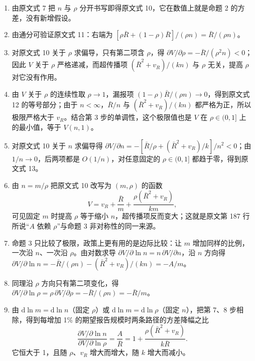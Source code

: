 \begin{enumerate}
\item 由原文式 7 把 $n$ 与 $\rho$ 分开书写即得原文式 10，它在数值上就是命题 2 的方差，没有新增假设。
\item 由通分可验证原文式 11：右端为 $[\rho\bar R+(1-\rho)\bar R]/(\rho n)=\bar R/(\rho n)$。
\item 对原文式 10 关于 $\rho$ 求偏导，只有第二项含 $\rho$，得 $\partial V/\partial\rho=-\bar R/(\rho^2n)<0$；因此 $V$ 关于 $\rho$ 严格递减，而超传播项 $(\bar R^2+v_R)/(kn)$ 与 $\rho$ 无关，提高 $\rho$ 对它没有作用。
\item 由 $V$ 关于 $\rho$ 的连续性取 $\rho\to1$，漏报项 $(1-\rho)\bar R/(\rho n)\to0$，得到原文式 12 的等号部分；由于 $n<\infty$，$\bar R/n$ 与 $(\bar R^2+v_R)/(kn)$ 都严格为正，所以极限严格大于 $v_R$。结合第 3 步的单调性，这个极限值也是 $V$ 在 $\rho\in(0,1]$ 上的最小值，等于 $V(n,1)$。
\item 对原文式 10 关于 $n$ 求偏导得 $\partial V/\partial n=-[\bar R/\rho+(\bar R^2+v_R)/k]/n^2<0$；由 $1/n\to0$，后两项都是 $O(1/n)$，对任意固定的 $\rho\in(0,1]$ 都趋于零，得到原文式 13。
\item 由 $n=m/\rho$ 把原文式 10 改写为 $(m,\rho)$ 的函数
\begin{equation*}
V=v_R+\frac{\bar R}{m}+\frac{\rho(\bar R^2+v_R)}{km},
\end{equation*}
可见固定 $m$ 时提高 $\rho$ 等于缩小 $n$，超传播项反而变大；这就是原文第 187 行所说“$A$ 依赖 $\rho$”与命题 3 非对称性的同一来源。
\item 命题 3 只比较了极限，政策上更有用的是边际比较：让 $m$ 增加同样的比例，一次沿 $n$、一次沿 $\rho$。由对数求导 $\partial V/\partial\ln n=n\,\partial V/\partial n$，沿 $n$ 方向得 $\partial V/\partial\ln n=-\bar R/(\rho n)-(\bar R^2+v_R)/(kn)=-A/m$。
\item 同理沿 $\rho$ 方向只有第二项变化，得 $\partial V/\partial\ln\rho=\rho\,\partial V/\partial\rho=-\bar R/(\rho n)=-\bar R/m$。
\item 由 $\mathrm d\ln m=\mathrm d\ln n$（固定 $\rho$）或 $\mathrm d\ln m=\mathrm d\ln\rho$（固定 $n$），把第 7、8 步相除，得到每增加 1\% 的期望报告规模时两条路径的方差降幅之比
\begin{equation}
\frac{\partial V/\partial\ln n}{\partial V/\partial\ln\rho}=\frac{A}{\bar R}=1+\frac{\rho(\bar R^2+v_R)}{k\bar R}.
\label{eq:pa-margratio}
\end{equation}
它恒大于 1，且随 $\rho$、$v_R$ 增大而增大，随 $k$ 增大而减小。
\end{enumerate}

